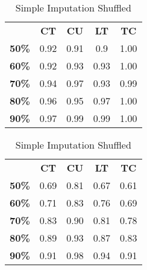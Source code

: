 \documentclass{article}
\begin{document}
\begin{table}[h]
\begin{minipage}{.45\textwidth}\centering
\begin{tabular}{ccccc}
              & \textbf{CT} & \textbf{CU} & \textbf{LT} & \textbf{TC} \\
\textbf{50\%} & 0.92        & 0.91        & 0.9         & 1.00        \\
\textbf{60\%} & 0.92        & 0.93        & 0.93        & 1.00        \\
\textbf{70\%} & 0.94        & 0.97        & 0.93        & 0.99        \\
\textbf{80\%} & 0.96        & 0.95        & 0.97        & 1.00        \\
\textbf{90\%} & 0.97        & 0.99        & 0.99        & 1.00       
\end{tabular}
\caption{Simple Imputation}
\end{minipage}
\hfill
\begin{minipage}{.45\textwidth}\centering
\begin{tabular}{ccccc}
              & \textbf{CT} & \textbf{CU} & \textbf{LT} & \textbf{TC} \\
\textbf{50\%} & 0.69        & 0.81        & 0.67        & 0.61        \\
\textbf{60\%} & 0.71        & 0.83        & 0.76        & 0.69        \\
\textbf{70\%} & 0.83        & 0.90        & 0.81        & 0.78        \\
\textbf{80\%} & 0.89        & 0.93        & 0.87        & 0.83        \\
\textbf{90\%} & 0.91        & 0.98        & 0.94        & 0.91       
\end{tabular}
\caption{Simple Imputation Shuffled}
\end{minipage}
\end{table}
\end{document}
